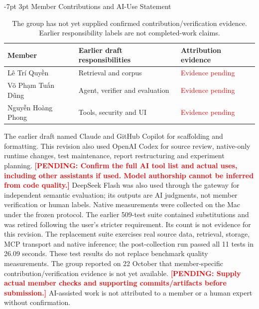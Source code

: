 \documentclass[a4paper,11pt]{article}
\makeatletter
\renewcommand\section{\@startsection{section}{1}{\z@}%
                                   {-7pt \@plus -1pt \@minus -1pt}%
                                   {3pt \@plus 1pt \@minus 1pt}%
                                   {\normalfont\large\bfseries}}
\newcommand{\pending}[1]{\textcolor{red}{\textbf{[PENDING: #1]}}}
\makeatother
\begin{document}
\section{Member Contributions and AI-Use Statement}
\begin{table}[H]\centering\footnotesize
\begin{tabularx}{\textwidth}{@{}L{3.2cm}X L{3.0cm}@{}}
\toprule Member & Earlier draft responsibilities & Attribution evidence\\\midrule
Lê Trí Quyền & Retrieval and corpus & \textcolor{red}{Evidence pending}\\
Võ Phạm Tuấn Dũng & Agent, verifier and evaluation & \textcolor{red}{Evidence pending}\\
Nguyễn Hoàng Phong & Tools, security and UI & \textcolor{red}{Evidence pending}\\
\bottomrule\end{tabularx}
\caption{The group has not yet supplied confirmed contribution/verification evidence. Earlier responsibility labels are not completed-work claims.}
\end{table}
The earlier draft named Claude and GitHub Copilot for scaffolding and formatting. This revision also used OpenAI Codex for source review, native-only runtime changes, test maintenance, report restructuring and experiment planning.
\pending{Confirm the full AI tool list and actual uses, including other assistants if used. Model authorship cannot be inferred from code quality.}
DeepSeek Flash was also used through the gateway for independent semantic evaluation; its outputs are AI judgments, not member verification or human labels. Native measurements were collected on the Mac under the frozen protocol. The earlier 509-test suite contained substitutions and was retired following the user's stricter requirement. Its count is not evidence for this revision. The replacement suite exercises real source data, retrieval, storage, MCP transport and native inference; the post-collection run passed all 11 tests in 26.09 seconds. These test results do not replace benchmark quality measurements.
The group reported on 22 October that member-specific contribution/verification evidence is not yet available. \pending{Supply actual member checks and supporting commits/artifacts before submission.} AI-assisted work is not attributed to a member or a human expert without confirmation.


\end{document}
